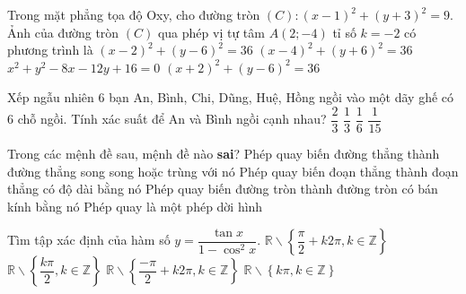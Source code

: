 \begin{ex} %
	Trong mặt phẳng tọa độ Oxy, cho đường tròn $(C):\left({x-1}\right)^2+\left({y+3}\right)^2=9$. Ảnh của đường tròn $(C)$ qua phép vị tự tâm $A\left(2;- 4\right)$ tỉ số $k = -2$ có phương trình là
\choice
	{$\left({x-2}\right)^2+\left({y-6}\right)^2=36$}
	{\True $\left({x-4}\right)^2+\left({y+6}\right)^2=36$}
	{$x^2+y^2-8x-12y+16=0$}
	{$\left({x+2}\right)^2+\left({y-6}\right)^2=36$}
\end{ex}
\begin{ex} %
	Xếp ngẫu nhiên 6 bạn An, Bình, Chi, Dũng, Huệ, Hồng ngồi vào một dãy ghế có 6 chỗ ngồi. Tính xác suất để An và Bình ngồi cạnh nhau?
	\choice
	{$\dfrac{2}{3}$}
	{\True $\dfrac{1}{3}$}
	{$\dfrac{1}{6}$}
	{$\dfrac{1}{15}$}
\end{ex}
\begin{ex} %
	Trong các mệnh đề sau, mệnh đề nào \textbf{sai}?
	\choice
	{\True Phép quay biến đường thẳng thành đường thẳng song song hoặc trùng với nó}
	{Phép quay biến đoạn thẳng thành đoạn thẳng có độ dài bằng nó}
	{Phép quay biến đường tròn thành đường tròn có bán kính bằng nó}
	{Phép quay là một phép dời hình}
\end{ex}
\begin{ex} %
	Tìm tập xác định của hàm số $y=\dfrac{\tan x}{1-\cos^2x}$.
	\choice
	{$\mathbb{R}\backslash \left\{{\dfrac{\pi}{2}+k2\pi,k\in \mathbb{Z}}\right\}$}
	{\True $\mathbb{R}\backslash \left\{{\dfrac{k\pi}{2},k\in \mathbb{Z}}\right\}$ }
	{$\mathbb{R}\backslash \left\{{\dfrac{-\pi}{2}+k2\pi,k\in \mathbb{Z}}\right\}$}
	{$\mathbb{R}\backslash \left\{{k\pi,k\in \mathbb{Z}}\right\}$}
\end{ex}
